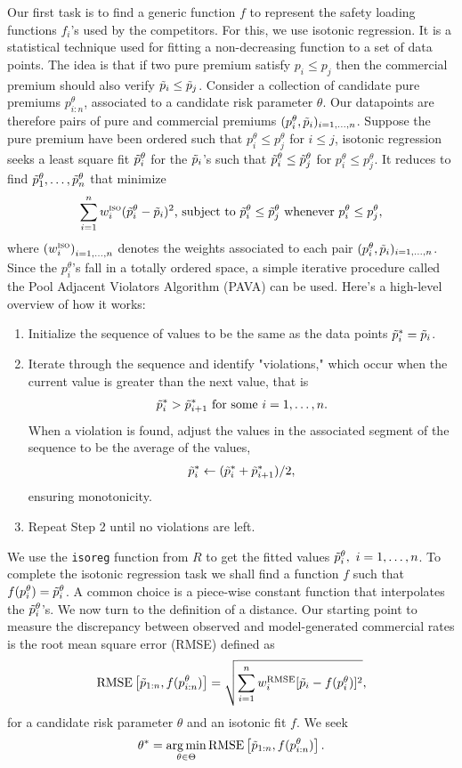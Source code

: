 \documentclass[10pt]{article}
\DeclareMathOperator*{\argmin}{arg\,min}
\begin{document}
Our first task is to find a generic function $f$ to represent the safety loading functions $f_i$'s used by the competitors. For this, we use isotonic regression. It is a statistical technique used for fitting a non-decreasing function to a set of data points. The idea is that if two pure premium satisfy $p_i\leq p_j$ then the commercial premium should also verify $\Tilde{p}_i\leq \Tilde{p}_j$. Consider a collection of candidate pure premiums $p_{i:n}^\theta$, associated to a candidate risk parameter $\theta$. Our datapoints are therefore pairs of pure and commercial premiums $(p_i^\theta,\Tilde{p}_i)_{i=1,\ldots, n}$. Suppose the pure premium have been ordered such that $p_i^\theta\leq p_j^\theta$ for $i\leq j$, isotonic regression seeks a least square fit $\Tilde{p}^\theta_i$ for the $\Tilde{p}_i$'s such that $\Tilde{p}^\theta_i\leq \Tilde{p}^\theta_j$ for $p_i^\theta\leq p_j^\theta$. It reduces to find $\Tilde{p}^\theta_1,\ldots, \Tilde{p}^\theta_n$ that minimize
$$
\sum_{i=1}^nw_i^{\textsc{iso}}(\Tilde{p}^\theta_i- \Tilde{p}_i)^2\text{, subject to }\Tilde{p}_i^\theta\leq \Tilde{p}^\theta_j\text{ whenever }p_i^\theta\leq p_j^\theta,
$$
where $\left(w_i^{\textsc{iso}}\right)_{i = 1, \ldots, n}$ denotes the weights associated to each pair $(p_i^\theta,\Tilde{p}_i)_{i=1,\ldots, n}$. Since the $p_i^\theta$'s fall in a totally ordered space, a simple iterative procedure called the Pool Adjacent Violators Algorithm (PAVA) can be used. Here's a high-level overview of how it works:
\begin{enumerate}
\item Initialize the sequence of values to be the same as the data points $\Tilde{p}_i^\ast =\Tilde{p}_i$.

\item Iterate through the sequence and identify "violations," which occur when the current value is greater than the next value, that is 
$$
\Tilde{p}_i^\ast>\Tilde{p}_{i+1}^\ast\text{ for some }i=1,\ldots, n.
$$ 
When a violation is found, adjust the values in the associated segment of the sequence to be the average of the values,
$$
\Tilde{p}_i^\ast \leftarrow (\Tilde{p}_i^\ast + \Tilde{p}_{i+1}^\ast)/2,
$$ 
ensuring monotonicity.
\item Repeat Step 2 until no violations are left. 
\end{enumerate}
We use the \texttt{isoreg} function from $R$ to get the fitted values $\Tilde{p}^\theta_i,\text{ }i=1,\ldots, n$. To complete the isotonic regression task we shall find a function $f$ such that $f(p_i^\theta)=\Tilde{p}^\theta_i$. A common choice is a piece-wise constant function that interpolates the $\Tilde{p}^\theta_i$'s. We now turn to the definition of a distance. Our starting point to measure the discrepancy between observed and model-generated commercial rates is the root mean square error (RMSE) defined as
\begin{equation}\label{eq:sse_distance}
\text{RMSE}\left[\Tilde{p}_{1:n}, f(p^\theta_{i:n})\right] = \sqrt{\sum_{i=1}^nw^{\text{RMSE}}_i [\Tilde{p}_i - f(p_i^\theta)]^2},
\end{equation}
for a candidate risk parameter $\theta$ and an isotonic fit $f$. We seek 
$$
\theta^\ast = \underset{\theta\in \Theta}{\argmin}\,
\text{RMSE}\left[\Tilde{p}_{1:n}, f(p^\theta_{i:n})\right].
$$
\end{document}
